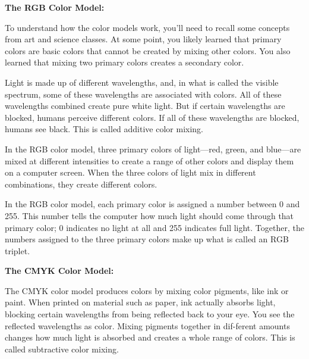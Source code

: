 \documentclass{report}
\begin{document}
        \bigbreak \noindent \bigbreak \noindent 

        \bigbreak \noindent \bigbreak \bigbreak \noindent 
        \begin{large}
            \noindent \textbf{The RGB Color Model:}
        \end{large}
        \bigbreak \noindent
         To understand how the color models work, you’ll need to recall some concepts from art and science classes. At some point, you likely learned that primary colors are basic colors that cannot be created by mixing other colors. You also learned that mixing two primary colors creates a secondary color.

        \bigbreak \noindent
        Light is made up of different wavelengths, and, in what is called the visible spectrum, some of these wavelengths are associated with colors. All of these wavelengths combined create pure white light. But if certain wavelengths are blocked, humans perceive different colors. If all of these wavelengths are blocked, humans see black. This is called additive color mixing.

        \bigbreak \noindent
        In the RGB color model, three primary colors of light—red, green, and blue—are mixed at different intensities to create a range of other colors and display them on a computer screen. When the three colors of light mix in different combinations, they create different colors.

        \bigbreak \noindent
        In the RGB color model, each primary color is assigned a number between 0 and 255. This number tells the computer how much light should come through that primary color; 0 indicates no light at all and 255 indicates full light. Together, the numbers assigned to the three primary colors make up what is called an RGB triplet.

        \bigbreak \noindent \bigbreak
        \begin{large}
            \noindent \textbf{The CMYK Color Model:}
        \end{large}
        
        \bigbreak \noindent
         The CMYK color model produces colors by mixing color pigments, like ink or paint. When printed on material such as paper, ink actually absorbs light, blocking certain wavelengths from being reflected back to your eye. You see the reflected wavelengths as color. Mixing pigments together in dif-ferent amounts changes how much light is absorbed and creates a whole range of colors. This is called subtractive color mixing.
\end{document}
